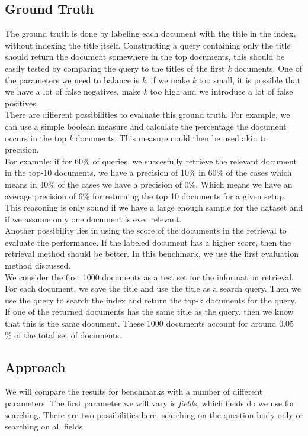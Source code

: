 \documentclass{article}
\begin{document}
\subsection{Ground Truth}
The ground truth is done by labeling each document with the title in the index, without indexing the title itself. Constructing a query containing only the title should return the document somewhere in the top documents, this should be easily tested by comparing the query to the titles of the first \textit{k} documents. One of the parameters we need to balance is \textit{k}, if we make \textit{k} too small, it is possible that we have a lot of false negatives, make \textit{k} too high and we introduce a lot of false positives.\\

There are different possibilities to evaluate this ground truth. For example, we can use a simple boolean measure and calculate the percentage the document occurs in the top \textit{k} documents. This measure could then be used akin to precision.\\

For example: if for 60\% of queries, we succesfully retrieve the relevant document in the top-10 documents, we have a precision of 10\% in 60\% of the cases which means in 40\% of the cases we have a precision of 0\%.
Which means we have an average precision of 6\% for returning the top 10 documents for a given setup. This reasoning is only sound if we have a large enough sample for the dataset and if we assume only one document is ever relevant.\\ 

Another possibility lies in using the score of the documents in the retrieval to evaluate the performance. If the labeled document has a higher score, then the retrieval method should be better. In this benchmark, we use the first evaluation method discussed.\\

We consider the first 1000 documents as a test set for the information retrieval. For each document, we save the title and use the title as a search query. Then we use the query to search the index and return the top-k documents for the query. If one of the returned documents has the same title as the query, then we know that this is the same document. These 1000 documents account for around 0.05 \% of the total set of documents.

\subsection{Approach}
We will compare the results for benchmarks with a number of different parameters. The first parameter we will vary is \textit{fields}, which fields do we use for searching. There are two possibilities here, searching on the question body only or searching on all fields.\\
\end{document}

